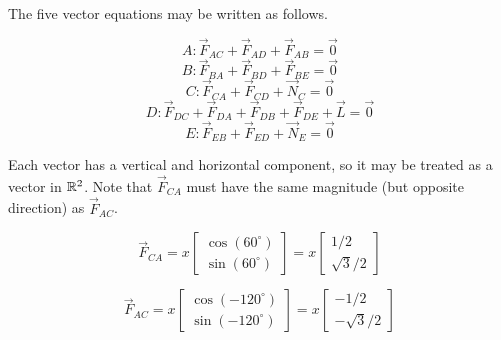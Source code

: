 \begin{remark}
The five vector equations may be written as follows.

\drawtruss

\[
A: \vec F_{AC}+\vec F_{AD}+\vec F_{AB}=\vec 0
\]
\[
B: \vec F_{BA}+\vec F_{BD}+\vec F_{BE}=\vec 0
\]
\[
C: \vec F_{CA}+\vec F_{CD}+\vec N_C=\vec 0
\]
\[
D: \vec F_{DC}+\vec F_{DA}+\vec F_{DB} +\vec F_{DE}+\vec L=\vec 0
\]
\[
E: \vec F_{EB}+\vec F_{ED}+\vec N_E=\vec 0
\]
\end{remark}


\begin{observation}
\drawtruss{}

Each vector has a vertical and horizontal component,
so it may be treated as a vector in \(\mathbb{R}^2\).
Note that \(\vec F_{CA}\) must have the same magnitude (but opposite
direction) as \(\vec F_{AC}\).

\[
  \vec{F}_{CA}
    = 
  x\begin{bmatrix} \cos(60^\circ) \\ \sin(60^\circ) \end{bmatrix}
    =
  x\begin{bmatrix} 1/2 \\ \sqrt{3}/2\end{bmatrix}
\]

\[
  \vec{F}_{AC}
    = 
  x\begin{bmatrix} \cos(-120^\circ) \\ \sin(-120^\circ) \end{bmatrix}
    =
  x\begin{bmatrix} -1/2 \\ -\sqrt{3}/2\end{bmatrix}
\]
\end{observation}


